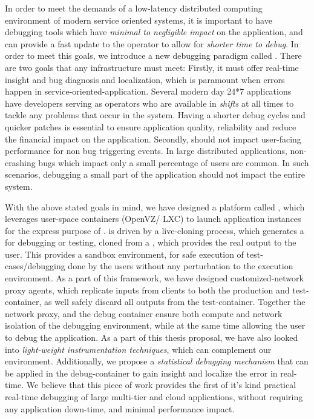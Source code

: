 In order to meet the demands of a low-latency distributed computing environment of modern service oriented systems, it is important to have debugging tools which have \textit{minimal to negligible impact} on the application, and can provide a fast update to the operator to allow for \textit{shorter time to debug}.
In order to meet this goals, we introduce a new debugging paradigm called \livedebugging.
There are two goals that any \livedebugging infrastructure must meet:
Firstly, it must offer real-time insight and bug diagnosis and localization, which is paramount when errors happen in service-oriented-application. 
Several modern day 24*7 applications have developers serving as operators who are available in \textit{shifts} at all times to tackle any problems that occur in the system.
Having a shorter debug cycles and quicker patches is essential to ensure application quality, reliability and reduce the financial impact on the application.
Secondly, \livedebugging should not impact user-facing performance for non bug triggering events.
In large distributed applications, non-crashing bugs which impact only a small percentage of users are common. 
In such scenarios, debugging a small part of the application should not impact the entire system.

With the above stated goals in mind, we have designed a platform called \parikshan, which leverages user-space containers (OpenVZ/ LXC) to launch application instances for the express purpose of \livedebugging. 
\parikshan is driven by a  live-cloning process, which generates a \debugcontainer for debugging or testing, cloned from a \productioncontainer, which provides the real output to the user.
This \debugcontainer provides a sandbox environment, for safe execution of test-cases/debugging done by the users without any perturbation to the execution environment.
As a part of this framework, we have designed customized-network proxy agents, which replicate inputs from clients to both the production and test-container, as well safely discard all outputs from the test-container.
Together the network proxy, and the debug container ensure both compute and network isolation of the debugging environment, while at the same time allowing the user to debug the application.
As a part of this thesis proposal, we have also looked into \textit{light-weight instrumentation techniques}, which can complement our \livedebugging environment.
Additionally, we propose a \textit{statistical debugging mechanism} that can be applied in the debug-container to gain insight and localize the error in real-time. 
We believe that this piece of work provides the first of it's kind practical real-time debugging of large multi-tier and cloud applications, without requiring any application down-time, and minimal performance impact.

